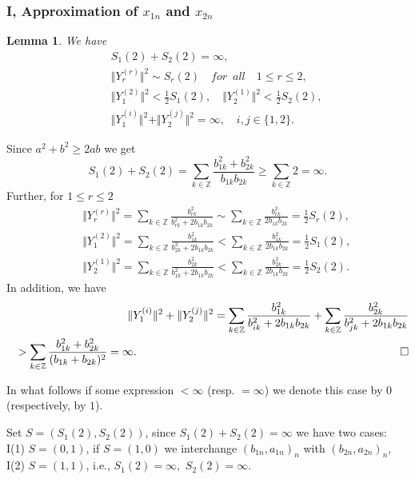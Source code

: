 \documentclass[preprint,12pt]{elsarticle}
\newtheorem{lem}[thm]{Lemma}
\numberwithin{equation}{section}
\begin{document}
\subsubsection{I, Approximation of $x_{1n}$ and $x_{2n}$}
% 
\begin{lem}
\label{l.S1+S2.m=2}
We have 
 \begin{eqnarray}
 \label{S1+S2}
 &&S_1(2)+S_2(2)=\infty,\\
\label{Yr-sim-Sr.m=2}
&& \Vert Y_r^{(r)}\Vert^2\sim S_r(2)\quad{for\,\,\, all}\quad 1\leq r\leq 2,\\ 
\label{Yr^s-<-Sr.m=2}
&& \Vert Y_1^{(2)}\Vert^2< \frac{1}{2}S_1(2),\quad
 \Vert Y_2^{(1)}\Vert^2< \frac{1}{2}S_2(2),\\
 \label{i_1,i_2.m=2} 
&&\Vert Y_1^{(i)}\Vert^2+\Vert Y_2^{(j)} \Vert^2=\infty,\quad
i,j\in \{1,2\}.
\end{eqnarray}
\end{lem}
%
%
\begin{pf} Since $a^2+b^2\geq 2ab$ we get
 \begin{equation*}
S_1(2)+S_2(2)=\sum_{k\in \mathbb Z}\frac{b_{1k}^2+b_{2k}^2}{b_{1k}b_{2k}}\geq \sum_{k\in \mathbb Z}2=\infty.
\end{equation*}
Further, for $1\leq r\leq 2$
\begin{eqnarray*}
&&
\Vert Y_r^{(r)} \Vert^2=\sum_{k\in \mathbb Z}\frac{b_{rk}^2}{b_{rk}^2+2b_{1k}b_{2k}}\sim  
\sum_{k\in \mathbb Z}\frac{b_{rk}^2}{2b_{1k}b_{2k}}=\frac{1}{2}S_r(2),\\
 &&\Vert Y_1^{(2)} \Vert^2=\sum_{k\in \mathbb Z}\frac{b_{1k}^2}{b_{2k}^2+2b_{1k}b_{2k}}<
\sum_{k\in \mathbb Z}\frac{b_{1k}^2}{2b_{1k}b_{2k}}= \frac{1}{2}S_1(2),\\
 &&\Vert Y_2^{(1)} \Vert^2=\sum_{k\in \mathbb Z}\frac{b_{2k}^2}{b_{1k}^2+2b_{1k}b_{2k}}<
\sum_{k\in \mathbb Z}\frac{b_{2k}^2}{2b_{1k}b_{2k}}= \frac{1}{2}S_2(2).
\end{eqnarray*}
In addition,  we have
\begin{eqnarray*}
&& \Vert Y_1^{(i)}\Vert^2+\Vert Y_2^{(j)} \Vert^2=
\sum_{k\in \mathbb Z}\frac{b_{1k}^2}{b_{ik}^2+2b_{1k}b_{2k}}+\sum_{k\in \mathbb Z}\frac{b_{2k}^2}{b_{jk}^2+2b_{1k}b_{2k}}\\
&&>\sum_{k\in \mathbb Z}\frac{b_{1k}^2+b_{2k}^2}{(b_{1k}+b_{2k})^2}=\infty.
\hskip 8.3cm \Box
\end{eqnarray*}
\end{pf}
%
{\bf
\begin{rem}
\label{r.(0,1)} 
In what follows  if some expression $<\infty$ (resp. $=\infty$)
we denote this case  by $0$ (respectively,  by $1$).
\end{rem}
}
%
Set $S=(S_1(2),S_2(2))$, since $S_1(2)+S_2(2)=\infty$ we have two cases:\\
I(1) $S=(0,1)$,  
if $S=(1,0)$ we interchange $(b_{1n},a_{1n})_n$ with  $(b_{2n},a_{2n})_n$,\\
I(2) $S=(1,1)$,
i.e., $S_1(2)=\infty,\,\,S_2(2)=\infty$.
%
\end{document}
